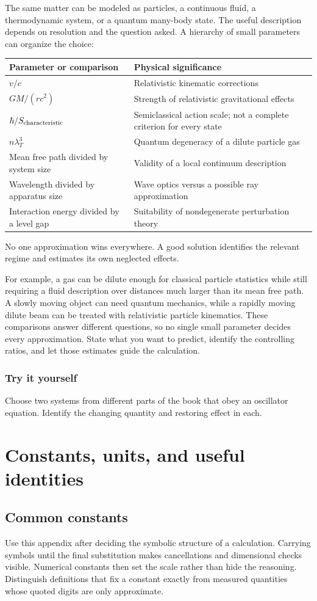 \documentclass[11pt,oneside]{book}
\theoremstyle{reviewstyle}
\newcommand{\learningcheck}[1]{\subsection*{Try it yourself}\noindent #1\par}
\begin{document}
The same matter can be modeled as particles, a continuous fluid, a thermodynamic system, or a quantum many-body state. The useful description depends on resolution and the question asked. A hierarchy of small parameters can organize the choice:
\begin{center}
\begin{tabular}{p{}p{}}
\toprule
Parameter or comparison & Physical significance\\
\midrule
$v/c$ & Relativistic kinematic corrections\\
$GM/(rc^2)$ & Strength of relativistic gravitational effects\\
$\hbar/S_{\rm characteristic}$ & Semiclassical action scale; not a complete criterion for every state\\
$n\lambda_T^3$ & Quantum degeneracy of a dilute particle gas\\
Mean free path divided by system size & Validity of a local continuum description\\
Wavelength divided by apparatus size & Wave optics versus a possible ray approximation\\
Interaction energy divided by a level gap & Suitability of nondegenerate perturbation theory\\
\bottomrule
\end{tabular}
\end{center}
No one approximation wins everywhere. A good solution identifies the relevant regime and estimates its own neglected effects.

For example, a gas can be dilute enough for classical particle statistics while still requiring a fluid description over distances much larger than its mean free path. A slowly moving object can need quantum mechanics, while a rapidly moving dilute beam can be treated with relativistic particle kinematics. These comparisons answer different questions, so no single small parameter decides every approximation. State what you want to predict, identify the controlling ratios, and let those estimates guide the calculation.

\appendix
\learningcheck{Choose two systems from different parts of the book that obey an oscillator equation. Identify the changing quantity and restoring effect in each.}

\chapter{Constants, units, and useful identities}
\section{Common constants}
Use this appendix after deciding the symbolic structure of a calculation. Carrying symbols until the final substitution makes cancellations and dimensional checks visible. Numerical constants then set the scale rather than hide the reasoning. Distinguish definitions that fix a constant exactly from measured quantities whose quoted digits are only approximate.
\end{document}
